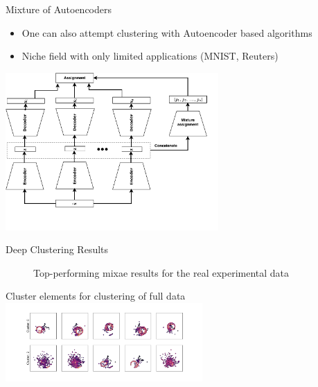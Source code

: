 \documentclass{beamer}
\begin{document}
\begin{frame}[t]{Mixture of Autoencoders}
	\begin{itemize}
		\item One can also attempt clustering with Autoencoder based algorithms
		\item Niche field with only limited applications (MNIST, Reuters)
	\end{itemize}

	\centering
	\includegraphics[height=6cm]{../chapters/theory/autoencoder/plots/mixae.pdf}
\end{frame}


\begin{frame}[t]{Deep Clustering Results}
	\centering 
	\begin{figure}[h]
		\caption{Top-performing mixae results for the real experimental data}
	\end{figure}
	Cluster elements for clustering of full data
	\includegraphics[height=3cm]{../chapters/results/clustering/plots/real_cluster_repr.pdf}
\end{frame}
\end{document}
